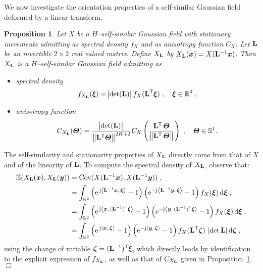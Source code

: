 \documentclass{elsarticle}
\newtheorem{proposition}{Proposition}
\newenvironment{proof}{\medskip\noindent{\bf Proof.}\;}{\null\hfill $\Box$\par\medskip }
\def\R{\mbox{$\mathbb{R}$}}
\begin{document}
\noindent 
We now investigate the orientation properties  of a self-similar Gaussian field deformed by a linear transform.
\begin{proposition}\label{pro:linear}
Let $X$ be a $H$--self-similar Gaussian field with stationary increments admitting as spectral density $f_X$ and as anisotropy function $C_X$. Let $\mathbf{L}$ be an invertible $2\times 2$ real valued matrix. Define $X_{\mathbf{L}}$ by $X_{\mathbf{L}}(\bm{x})=X(\mathbf{L}^{-1} \bm{x})$. Then $X_{\mathbf{L}}$ is a $H$--self-similar Gaussian field admitting as
\begin{itemize}
\item spectral density 
\[
f_{X_\mat{L}}(\vect{\xi})=\abs{\det(\mat{L})} f_X(\mat{L}^{\T}\vect{\xi})\;, \quad \vect{\xi} \in \R^2\;,
\]
\item anisotropy function 
\[
C_{X_{\mathbf{L}}}(\bm{\Theta})=\frac{\abs{\det(\mathbf{L})}}{\left\lVert\mathbf{L}^{\mathsf{T}} \bm{\Theta}\right\rVert^{2H+2}}C_X\left(\frac{\mathbf{L}^{\mathsf{T}}\,\bm{\Theta}}{\left\lVert\mathbf{L}^{\mathsf{T}}\,\bm{\Theta}\right\rVert}\right)\;, \quad \bm{\Theta}\in\mathbb{S}^1.
\]
\end{itemize}
\end{proposition}
\begin{proof}
The self-similarity and stationarity properties of $X_{\mathbf{L}}$ directly come from that of $X$ and of the linearity of $\mathbf{L}$. To compute the spectral density of $X_{\mathbf{L}}$, observe that:
\begin{align*}
\mathbb{E}(X_\mat{L}(\vect{x}),X_\mat{L}(\vect{y}))
&= \mathrm{Cov}(X(\mat{L}^{-1}\vect{x}),X(\mat{L}^{-1}\vect{y}))\;,\\
&=\int_{\mathbb{R}^2}\left(\expj{\ip{\mat{L}^{-1}\vect{x}}{\vect{\xi}}}-1\right)\left(\eu^{-\jj \ip{\mat{L}^{-1}\vect{y}}{\vect{\xi}}}-1\right)f_X(\vect{\xi})\dif \vect{\xi}\;,\\
&=\int_{\mathbb{R}^2}\left(\expj{\ip{\vect{x}}{(\mat{L}^{-1})^\T\vect{\xi}}}-1\right)\left(\eu^{-\jj \ip{\vect{y}}{(\mat{L}^{-1})^\T \vect{\xi}}}-1\right)f_X(\vect{\xi})\dif \vect{\xi}\;,\\
&=\int_{\mathbb{R}^2}\left(\expj{\ip{\vect{x}}{\vect{\zeta}}}-1\right)\left(\eu^{-\jj \ip{\vect{y}}{\vect{\zeta}}}-1\right)f_X(\mat{L}^\T \vect{\zeta})~
\lvert \mathrm{det}\, \mat{L}\rvert \dif \vect{\zeta}\;,
\end{align*}
using the change of variable $\bm{\bm{\zeta}}= (\mathbf{L}^{-1})^{\mathsf{T}} \bm{\xi}$, which directly leads by identification to the explicit expression of $f_{X_{\mathbf{L}}}$, as well as that of $C_{X_{\mathbf{L}}}$ given in Proposition~\ref{pro:linear}. 
\end{proof}
\end{document}
